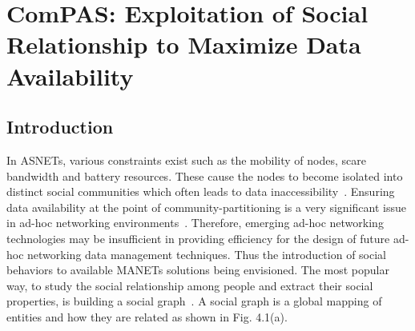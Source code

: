 \chapter{ComPAS: Exploitation of Social Relationship to Maximize Data Availability}\label{Chap4}

\section{Introduction}\label{Chap4_01}

In ASNETs, various constraints exist such as the mobility of nodes, scare bandwidth and battery resources. These cause the nodes to become isolated into distinct social communities which often leads to data inaccessibility~\cite{THara2009}\cite{C2008}. Ensuring data availability at the point of community-partitioning is a very significant issue in ad-hoc networking environments~\cite{THara2001}. Therefore, emerging ad-hoc networking technologies may be insufficient in providing efficiency for the design of future ad-hoc networking data management techniques. Thus the introduction of social behaviors to available MANETs solutions being envisioned. The most popular way, to study the social relationship among people and extract their social properties, is building a social graph~\cite{YZhu2013}\cite{KWei2013}. A social graph is a global mapping of entities and how they are related as shown in Fig. 4.1(a).

